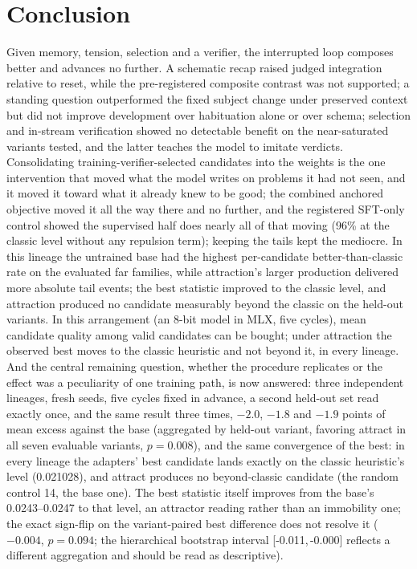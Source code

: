 \documentclass[11pt]{article}
\newcommand{\ci}[2]{[#1,\,#2]}
\begin{document}
\section{Conclusion}
\label{sec:conclusion}

Given memory, tension, selection and a verifier, the interrupted loop
composes better and advances no further. A schematic recap raised judged
integration relative to reset, while the pre-registered composite
contrast was not supported; a standing question outperformed the fixed
subject change under preserved context but did not improve development
over habituation alone or over schema; selection
and in-stream verification showed no detectable benefit on the
near-saturated variants tested, and the latter teaches the model to
imitate verdicts. Consolidating training-verifier-selected candidates
into the weights is the one intervention that moved what the model writes
on problems it had not seen, and it moved it toward what it already knew
to be good; the combined anchored objective moved it all the way there
and no further, and the registered SFT-only control showed the
supervised half does nearly all of that moving (96\% at the classic
level without any repulsion term);
keeping the tails kept the mediocre. In this lineage the untrained base
had the highest per-candidate better-than-classic rate on the evaluated
far families, while attraction's larger production delivered more
absolute tail events; the best statistic improved to the classic level,
and attraction produced no candidate measurably beyond the classic on
the held-out variants. In this arrangement (an 8-bit model in MLX, five
cycles), mean candidate quality among valid candidates can be bought;
under attraction the observed best moves to the classic heuristic and
not beyond it, in every lineage. And the central remaining question, whether
the procedure replicates or the effect was a peculiarity of one training
path, is now answered: three independent lineages, fresh seeds, five
cycles fixed in advance, a second held-out set read exactly once, and
the same result three times, $-2.0$, $-1.8$ and $-1.9$ points of mean
excess against the base (aggregated by held-out variant, favoring
attract in all seven evaluable variants, $p=0.008$), and the same
convergence of the best: in every lineage the adapters' best candidate
lands exactly on the classic heuristic's level (0.021028), and attract
produces no beyond-classic candidate (the random control 14, the base
one). The best statistic itself improves from the
base's 0.0243--0.0247 to that level, an attractor reading rather than an
immobility one; the exact sign-flip on the variant-paired best
difference does not resolve it ($-0.004$, $p=0.094$; the hierarchical
bootstrap interval \ci{-0.011}{-0.000} reflects a different aggregation
and should be read as descriptive).
\end{document}
